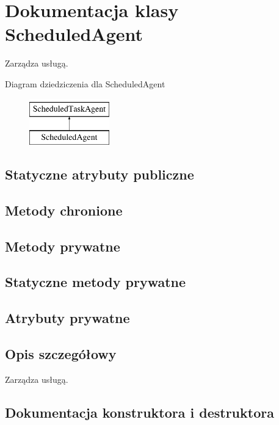 \hypertarget{a00052}{}\section{Dokumentacja klasy Scheduled\+Agent}
\label{a00052}


Zarządza usługą.  


Diagram dziedziczenia dla Scheduled\+Agent\begin{figure}[H]
\begin{center}
\leavevmode
\includegraphics[height=2.000000cm]{d1/d84/a00052}
\end{center}
\end{figure}
\subsection*{Statyczne atrybuty publiczne}
\subsection*{Metody chronione}
\subsection*{Metody prywatne}
\subsection*{Statyczne metody prywatne}
\subsection*{Atrybuty prywatne}


\subsection{Opis szczegółowy}
Zarządza usługą. 



\subsection{Dokumentacja konstruktora i destruktora}
\hypertarget{a00052_a76c7bc25d5cb94c3c60006a010c685d6}{}
